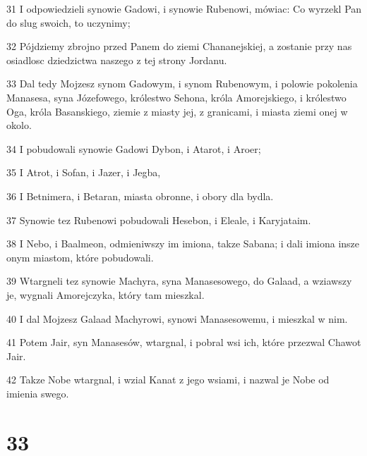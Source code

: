 \par 31 I odpowiedzieli synowie Gadowi, i synowie Rubenowi, mówiac: Co wyrzekl Pan do slug swoich, to uczynimy;
\par 32 Pójdziemy zbrojno przed Panem do ziemi Chananejskiej, a zostanie przy nas osiadlosc dziedzictwa naszego z tej strony Jordanu.
\par 33 Dal tedy Mojzesz synom Gadowym, i synom Rubenowym, i polowie pokolenia Manasesa, syna Józefowego, królestwo Sehona, króla Amorejskiego, i królestwo Oga, króla Basanskiego, ziemie z miasty jej, z granicami, i miasta ziemi onej w okolo.
\par 34 I pobudowali synowie Gadowi Dybon, i Atarot, i Aroer;
\par 35 I Atrot, i Sofan, i Jazer, i Jegba,
\par 36 I Betnimera, i Betaran, miasta obronne, i obory dla bydla.
\par 37 Synowie tez Rubenowi pobudowali Hesebon, i Eleale, i Karyjataim.
\par 38 I Nebo, i Baalmeon, odmieniwszy im imiona, takze Sabana; i dali imiona insze onym miastom, które pobudowali.
\par 39 Wtargneli tez synowie Machyra, syna Manasesowego, do Galaad, a wziawszy je, wygnali Amorejczyka, który tam mieszkal.
\par 40 I dal Mojzesz Galaad Machyrowi, synowi Manasesowemu, i mieszkal w nim.
\par 41 Potem Jair, syn Manasesów, wtargnal, i pobral wsi ich, które przezwal Chawot Jair.
\par 42 Takze Nobe wtargnal, i wzial Kanat z jego wsiami, i nazwal je Nobe od imienia swego.

\chapter{33}

